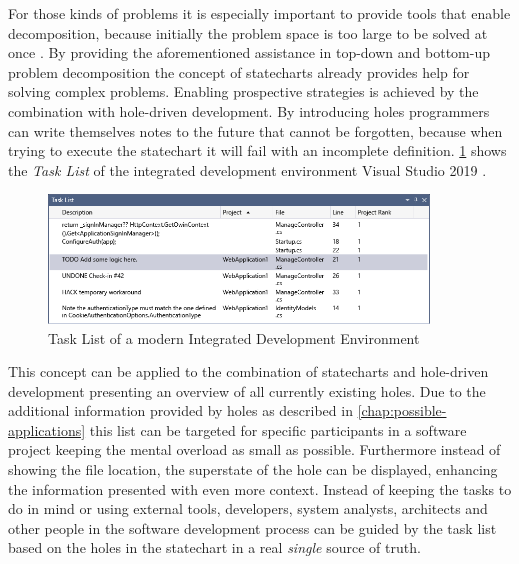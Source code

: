 For those kinds of problems it is especially important to provide tools that enable decomposition, because initially the problem space is too large to be solved at once \autocite{dutke_mentale_1994}.
By providing the aforementioned assistance in top-down and bottom-up problem decomposition the concept of statecharts already provides help for solving complex problems.
Enabling prospective strategies is achieved by the combination with hole-driven development.
By introducing holes programmers can write themselves notes to the future that cannot be forgotten, because when trying to execute the statechart it will fail with an incomplete definition.
\cref{fig:vs-task-list} shows the \emph{Task List} of the integrated development environment Visual Studio 2019 \autocite{hogensen_use_2019}.
\begin{figure}[h]
\centering
\includegraphics[width=0.9\textwidth]{images/task-list}
\caption{Task List of a modern Integrated Development Environment}
\label{fig:vs-task-list}
\end{figure}
This concept can be applied to the combination of statecharts and hole-driven development presenting an overview of all currently existing holes.
Due to the additional information provided by holes as described in \cref{chap:possible-applications} this list can be targeted for specific participants in a software project keeping the mental overload as small as possible.
Furthermore instead of showing the file location, the superstate of the hole can be displayed, enhancing the information presented with even more context.
Instead of keeping the tasks to do in mind or using external tools, developers, system analysts, architects and other people in the software development process can be guided by the task list based on the holes in the statechart in a real \emph{single} source of truth.


